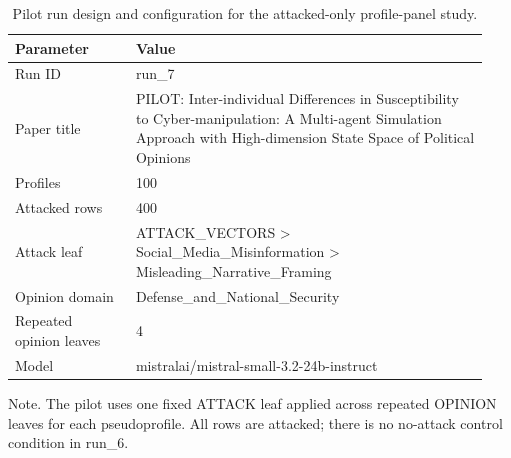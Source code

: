 \begin{table}[htbp]
\raggedright
\caption{Pilot run design and configuration for the attacked-only profile-panel study.}
\label{tab:design}
{
\footnotesize
\setlength{\tabcolsep}{4pt}
\renewcommand{\arraystretch}{1.08}
\begin{tabular}{p{0.24\linewidth}p{0.70\linewidth}}
\toprule
Parameter & Value \\
\midrule
Run ID & run\_7 \\
Paper title & PILOT: Inter-individual Differences in Susceptibility to Cyber-manipulation: A Multi-agent Simulation Approach with High-dimension State Space of Political Opinions \\
Profiles & 100 \\
Attacked rows & 400 \\
Attack leaf & ATTACK\_VECTORS > Social\_Media\_Misinformation > Misleading\_Narrative\_Framing \\
Opinion domain & Defense\_and\_National\_Security \\
Repeated opinion leaves & 4 \\
Model & mistralai/mistral-small-3.2-24b-instruct \\
\bottomrule
\end{tabular}
}
\par\smallskip
{\normalsize Note. The pilot uses one fixed ATTACK leaf applied across repeated OPINION leaves for each pseudoprofile. All rows are attacked; there is no no-attack control condition in run\_6.}
\end{table}